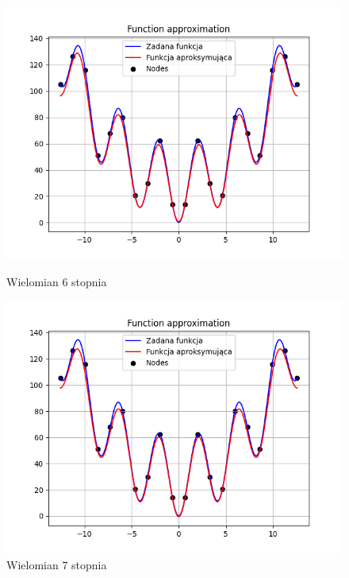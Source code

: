 \documentclass{article}
\begin{document}
\begin{figure}[H]
  \begin{minipage}[b]{0.49\textwidth}
    \begin{minipage}[b]{\textwidth}
      \includegraphics[width=\textwidth]{img14.png}
      \caption{Wielomian 6 stopnia}
    \end{minipage}
    \vspace*{\fill}
    \begin{minipage}[b]{\textwidth}
      \includegraphics[width=\textwidth]{img15.png}
      \caption{Wielomian 7 stopnia}
    \end{minipage}
  \end{minipage}
  \hfill
  \begin{minipage}[b]{0.49\textwidth}

\end{minipage}
\end{figure}
\end{document}
